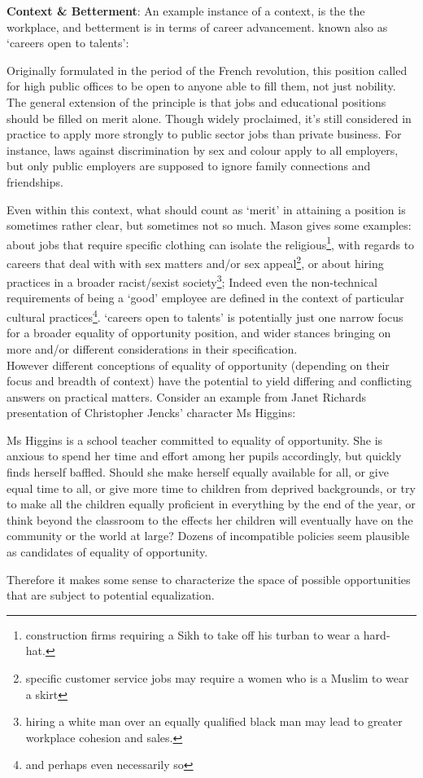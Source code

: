 \documentclass{article}
\begin{document}
\textbf{Context \& Betterment}: An example instance of a context, is the the workplace, and betterment is in terms of career advancement.  known also as `careers open to talents':
\begin{displayquote}
Originally formulated in the period of the French revolution, this position called for high public offices to be open to anyone able to fill them, not just nobility. The general extension of the principle is that jobs and educational positions should be filled on merit alone. Though widely proclaimed, it's still considered in practice to apply more strongly to public sector jobs than private business. For instance, laws against discrimination by sex and colour apply to all employers, but only public employers are supposed to ignore family connections and friendships.\cite{baker1992arguing}
\end{displayquote}
Even within this context, what should count as `merit' in attaining a position is sometimes rather clear, but sometimes not so much.
Mason \cite{mason2006levelling} gives some examples: about jobs that require specific clothing can isolate the religious\footnote{construction firms requiring a Sikh to take off his turban to wear a hard-hat.}, with regards to careers that deal with with sex matters and/or sex appeal\footnote{specific customer service jobs may require a women who is a Muslim to wear a skirt}, or about hiring practices in a broader racist/sexist society\footnote{hiring a white man over an equally qualified black man may lead to greater workplace cohesion and sales.}; Indeed even the non-technical requirements of being a `good' employee are defined in the context of particular cultural practices\footnote{and perhaps even necessarily so}.
`careers open to talents' is potentially just one narrow focus for a broader equality of opportunity position, and wider stances bringing on more and/or different considerations in their specification.\\

However different conceptions of equality of opportunity (depending on their focus and breadth of context) have the potential to yield differing and conflicting answers on practical matters.
Consider an example from Janet Richards\cite{} presentation of Christopher Jencks' character Ms Higgins:
\begin{displayquote}
Ms Higgins is a school teacher committed to equality of opportunity. She is anxious to spend her time and effort among her pupils accordingly, but quickly finds herself baffled. Should she make herself equally available for all, or give equal time to all, or give more time to children from deprived backgrounds, or try to make all the children equally proficient in everything by the end of the year, or think beyond the classroom to the effects her children will eventually have on the community or the world at large? Dozens of incompatible policies seem plausible as candidates of equality of opportunity.
\end{displayquote}
Therefore it makes some sense to characterize the space of possible opportunities that are subject to potential equalization.
\end{document}
